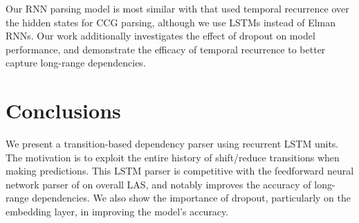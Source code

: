 Our RNN parsing model is most similar with  that used temporal recurrence over the hidden states for CCG parsing, although we use LSTMs instead of Elman RNNs. Our work additionally investigates the effect of dropout on model performance, and demonstrate the efficacy of temporal recurrence to better capture long-range dependencies.

\section{Conclusions}

We present a transition-based dependency parser using recurrent LSTM units. The motivation is to exploit the entire history of shift/reduce transitions when making predictions. This LSTM parser is competitive with the feedforward neural network parser of  on overall LAS, and notably improves the accuracy of long-range dependencies. We also show the importance of dropout, particularly on the embedding layer, in improving the model's accuracy.%





